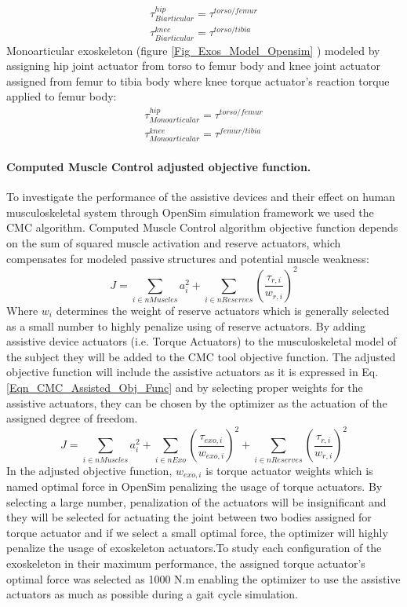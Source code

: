 \documentclass[10pt,letterpaper]{article}
\begin{document}
\begin{align}\label{Eqn_Biarticular_Torque_Act}
\tau^{hip}_{Biarticular} = \tau^{torso/femur}\\
\tau^{knee}_{Biarticular} = \tau^{torso/tibia}
\end{align}
Monoarticular exoskeleton (figure \ref{Fig_Exos_Model_Opensim} ) modeled by assigning hip joint actuator from torso to femur body and knee joint actuator assigned from femur to tibia body where knee torque actuator's reaction torque applied to femur body:
\begin{align}\label{Eqn_Monoarticular_Torque_Act}
\tau^{hip}_{Monoarticular} = \tau^{torso/femur}\\
\tau^{knee}_{Monoarticular} = \tau^{femur/tibia}
\end{align}
\paragraph*{Computed Muscle Control adjusted objective function.} To investigate the performance of the assistive devices and their effect on human musculoskeletal system through OpenSim simulation framework we used the CMC algorithm. Computed Muscle Control algorithm objective function depends on the sum of squared muscle activation and reserve actuators, which compensates for modeled passive structures and potential muscle weakness\cite{93}:
\begin{equation}\label{Eqn_CMC_Normal_Obj_Func}
J = \sum_{i\in nMuscles} a_{i}^{2} + \sum_{i \in nReserves} (\frac{\tau_{r,i}}{w_{r,i}})^2
\end{equation}
Where $w_i$ determines the weight of reserve actuators which is generally selected as a small number to highly penalize using of reserve actuators. By adding assistive device actuators (i.e. Torque Actuators) to the musculoskeletal model of the subject they will be added to the CMC tool objective function. The adjusted objective function will include the assistive actuators as it is expressed in Eq. \eqref{Eqn_CMC_Assisted_Obj_Func} and by selecting proper weights for the assistive actuators, they can be chosen by the optimizer as the actuation of the assigned degree of freedom.
\begin{equation}\label{Eqn_CMC_Assisted_Obj_Func}
	J = \sum_{i\in nMuscles} a_{i}^{2} + \sum_{i \in nExo} \left(\frac{\tau_{exo,i}}{w_{exo,i}}\right)^{2} +  \sum_{i \in nReserves} \left(\frac{\tau_{r,i}}{w_{r,i}}\right)^2
\end{equation}
In the adjusted objective function, $w_{exo,i}$ is torque actuator weights which is named optimal force in OpenSim \cite{93} penalizing the usage of torque actuators. By selecting a large number, penalization of the actuators will be insignificant and they will be selected for actuating the joint between two bodies assigned for torque actuator and if we select a small optimal force, the optimizer will highly penalize the usage of exoskeleton actuators.To study each configuration of the exoskeleton in their maximum performance, the assigned torque actuator's optimal force was selected as 1000 N.m enabling the optimizer to use the assistive actuators as much as possible during a gait cycle simulation.\\
\end{document}
